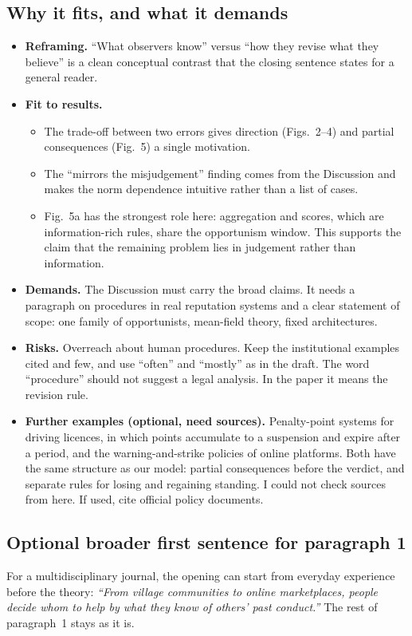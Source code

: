 \documentclass[11pt]{article}
\begin{document}
\subsection*{Why it fits, and what it demands}
\begin{itemize}[leftmargin=1.2em]
\item \textbf{Reframing.} ``What observers know'' versus ``how they revise what they believe'' is a clean conceptual contrast that the closing sentence states for a general reader.
\item \textbf{Fit to results.}
  \begin{itemize}[leftmargin=1.2em]
  \item The trade-off between two errors gives direction (Figs.~2--4) and partial consequences (Fig.~5) a single motivation.
  \item The ``mirrors the misjudgement'' finding comes from the Discussion and makes the norm dependence intuitive rather than a list of cases.
  \item Fig.~5a has the strongest role here: aggregation and scores, which are information-rich rules, share the opportunism window. This supports the claim that the remaining problem lies in judgement rather than information.
  \end{itemize}
\item \textbf{Demands.} The Discussion must carry the broad claims. It needs a paragraph on procedures in real reputation systems and a clear statement of scope: one family of opportunists, mean-field theory, fixed architectures.
\item \textbf{Risks.} Overreach about human procedures. Keep the institutional examples cited and few, and use ``often'' and ``mostly'' as in the draft. The word ``procedure'' should not suggest a legal analysis. In the paper it means the revision rule.
\item \textbf{Further examples (optional, need sources).} Penalty-point systems for driving licences, in which points accumulate to a suspension and expire after a period, and the warning-and-strike policies of online platforms. Both have the same structure as our model: partial consequences before the verdict, and separate rules for losing and regaining standing. I could not check sources from here. If used, cite official policy documents.
\end{itemize}

\subsection*{Optional broader first sentence for paragraph 1}
For a multidisciplinary journal, the opening can start from everyday experience before the theory: \emph{``From village communities to online marketplaces, people decide whom to help by what they know of others' past conduct\cite{milinski2016,tadelis2016}.''} The rest of paragraph~1 stays as it is.
\end{document}
